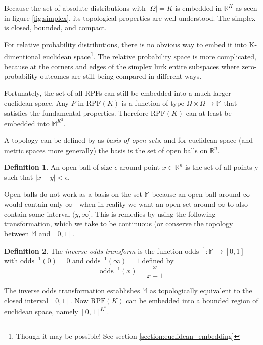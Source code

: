 \documentclass[twoside]{article}
\theoremstyle{plain}%
\theoremstyle{definition}
\newtheorem{definition}{Definition}[section]
\theoremstyle{remark}
\begin{document}
Because the set of absolute distributions with \(|\Omega| = K\) is embedded in \(\mathbb{R}^K\) as seen in figure \ref{fig:simplex}, its topological properties are well understood. The simplex is closed, bounded, and compact.

For relative probability distributions, there is no obvious way to embed it into K-dimentional euclidean space\footnote{Though it may be possible! See section \ref{section:euclidean_embedding}}. The relative probability space is more complicated, because at the corners and edges of the simplex lurk entire subspaces where zero-probability outcomes are still being compared in different ways.

Fortunately, the set of all RPFs can still be embedded into a much larger euclidean space. Any \(P\) in \(\text{RPF}(K)\) is a function of type \(\Omega \times \Omega \rightarrow \mathbb{M}\) that satisfies the fundamental properties. Therefore \(\text{RPF}(K)\) can at least be embedded into \(\mathbb{M}^{K^2}\).

A topology can be defined by as \textit{basis of open sets}, and for euclidean space (and metric spaces more generally) the basis is the set of open balls on \(\mathbb{R}^n\).

\begin{definition}
An open ball of size \(\epsilon\) around point \(x \in \mathbb{R}^n\) is the set of all points y such that \(|x - y| < \epsilon\).
\end{definition}

Open balls do not work as a basis on the set \(\mathbb{M}\) because an open ball around \(\infty\) would contain only \(\infty\) - when in reality we want an open set around \(\infty\) to also contain some interval \((y, \infty]\). This is remedies by using the following transformation, which we take to be continuous (or conserve the topology between \(\mathbb{M}\) and \([0, 1]\).

\begin{definition}
The \textit{inverse odds transform} is the function \(\text{odds}^{-1}: \mathbb{M} \rightarrow [0, 1]\) with \(\text{odds}^{-1}(0) = 0\) and \(\text{odds}^{-1}(\infty) = 1\) defined by
\[\text{odds}^{-1}(x) = \frac{x}{x + 1}\]
\end{definition}

The inverse odds transformation establishes \(\mathbb{M}\) as topologically equivalent to the closed interval \([0, 1]\). Now \(\text{RPF}(K)\) can be embedded into a bounded region of euclidean space, namely \([0, 1]^{K^2}\).
\end{document}
